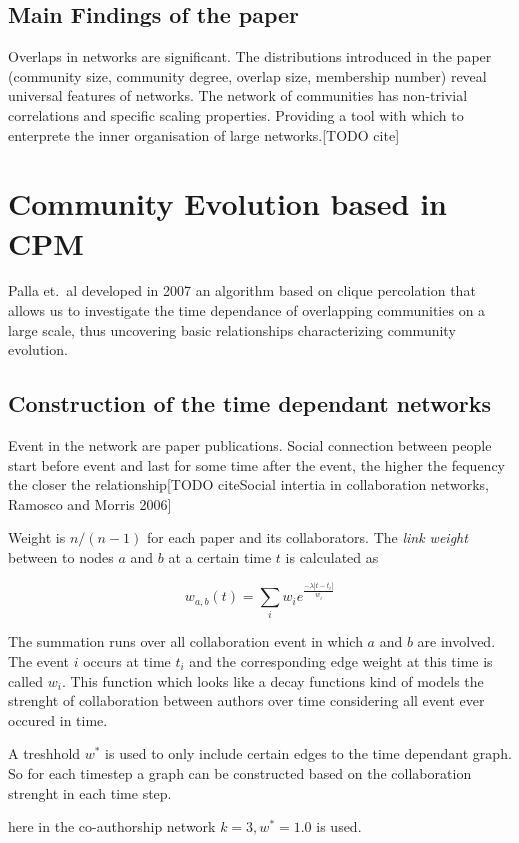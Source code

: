\documentclass[runningheads,a4paper]{llncs}
\begin{document}
\subsection{Main Findings of the paper}
Overlaps in networks are significant. The distributions introduced in the paper (community size, community degree, overlap size, membership number) reveal universal features of networks. The network of communities has non-trivial correlations and specific scaling properties. Providing a tool with which to enterprete the inner organisation of large networks.[TODO cite]

\section{Community Evolution based in CPM}
\label{evolution}
Palla et.~al developed \cite{palla2007quantifying} in 2007 an algorithm based on clique percolation that allows us to investigate the time dependance of overlapping communities on a large scale, thus uncovering basic relationships characterizing community evolution.

\subsection{Construction of the time dependant networks}
Event in the network are paper publications. Social connection between people start before event and last for some time after the event, the higher the fequency the closer the relationship[TODO citeSocial intertia in collaboration networks, Ramosco and Morris 2006]

Weight is $n/(n-1)$ for each paper and its collaborators.
The \emph{link weight} between to nodes $a$ and $b$ at a certain time $t$ is calculated as

$$w_{a,b}(t)= \sum_{i}^{} w_i e^{\frac{-\lambda \left|t-t_i\right|}{w_i}}$$

The summation runs over all collaboration event in which $a$ and $b$ are involved. The event $i$ occurs at time $t_i$ and the corresponding edge weight at this time is called $w_i$. This function which looks like a decay functions kind of models the strenght of collaboration between authors over time considering all event ever occured in time.

A treshhold $w^*$ is used to only include certain edges to the time dependant graph. So for each timestep a graph can be constructed based on the collaboration strenght in each time step.

here in the co-authorship network $k=3, w^*=1.0$ is used.
\end{document}
